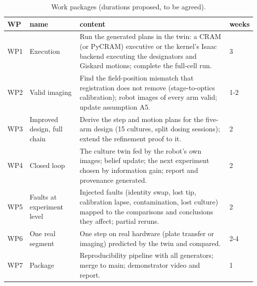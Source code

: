 \documentclass[10.5pt,a4paper]{article}
\begin{document}
\begin{table}[htbp]\centering\footnotesize\caption{Work packages (durations proposed, to be agreed).}
\begin{tabularx}{\linewidth}{@{}p{0.9cm}p{2.6cm}Xp{1.3cm}@{}}\toprule WP & name & content & weeks \\\midrule
WP1 & Execution & Run the generated plans in the twin: a CRAM (or PyCRAM) executive or the kernel's Isaac backend executing the designators and Giskard motions; complete the full-cell run. & 3 \\
WP2 & Valid imaging & Find the field-position mismatch that registration does not remove (stage-to-optics calibration); robot images of every arm valid; update assumption A5. & 1-2 \\
WP3 & Improved design, full chain & Derive the step and motion plans for the five-arm design (15 cultures, split dosing sessions); extend the refinement proof to it. & 2 \\
WP4 & Closed loop & The culture twin fed by the robot's own images; belief update; the next experiment chosen by information gain; report and provenance generated. & 2 \\
WP5 & Faults at experiment level & Injected faults (identity swap, lost tip, calibration lapse, contamination, lost culture) mapped to the comparisons and conclusions they affect; partial reruns. & 2 \\
WP6 & One real segment & One step on real hardware (plate transfer or imaging) predicted by the twin and compared. & 2-4 \\
WP7 & Package & Reproducibility pipeline with all generators; merge to main; demonstrator video and report. & 1 \\\bottomrule\end{tabularx}\end{table}
\end{document}
